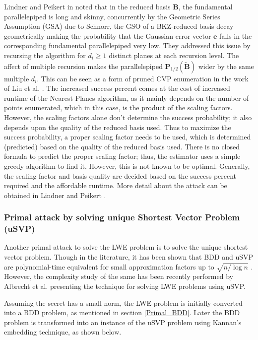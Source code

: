 Lindner and Peikert in \cite{lindner2011better} noted that in the reduced basis $\textbf{B}$, the fundamental parallelepiped is long and skinny, concurrently by the Geometric Series Assumption (GSA) due to Schnorr, the GSO of a BKZ-reduced basis decay geometrically making the probability that the Gaussian error vector $\textbf{e}$ falls in the corresponding fundamental parallelepiped very low. They addressed this issue by recursing the algorithm for $d_i \geq 1$ distinct planes at each recursion level. The affect of multiple recursion makes the parallelepiped $\textbf{P}_{1/2}(\tilde{\textbf{B}})$ wider by the same multiple $d_i$. This can be seen as a form of pruned CVP enumeration in the work of Liu et al. \cite{liu2013solving}. The increased success percent comes at the cost of increased runtime of the Nearest Planes algorithm, as it mainly depends on the number of points enumerated, which in this case, is the product of the scaling factors. However, the scaling factors alone don't determine the success probability; it also depends upon the quality of the reduced basis used. Thus to maximize the success probability, a proper scaling factor needs to be used, which is determined (predicted) based on the quality of the reduced basis used. There is no closed formula to predict the proper scaling factor; thus, the estimator uses a simple greedy algorithm to find it. However, this is not known to be optimal. Generally, the scaling factor and basis quality are decided based on the success percent required and the affordable runtime. More detail about the attack can be obtained in Lindner and Peikert \cite{lindner2011better}.



\subsubsection{Primal attack by solving unique Shortest Vector Problem (uSVP)\label{Primal_uSVP}}
Another primal attack to solve the LWE problem is to solve the unique shortest vector problem. Though in the literature, it has been shown that BDD and uSVP are polynomial-time equivalent for small approximation factors up to $\sqrt{n/\log{n}}$ \cite{lyubashevsky2009bounded}. However, the complexity study of the same has been recently performed by Albrecht et al. \cite{albrecht2014efficacy} presenting the technique for solving LWE problems using uSVP.

Assuming the secret has a small norm, the LWE problem is initially converted into a BDD problem, as mentioned in section \ref{Primal_BDD}. Later the BDD problem is transformed into an instance of the uSVP problem using Kannan's \cite{kannan1987minkowski} embedding technique, as shown below.


